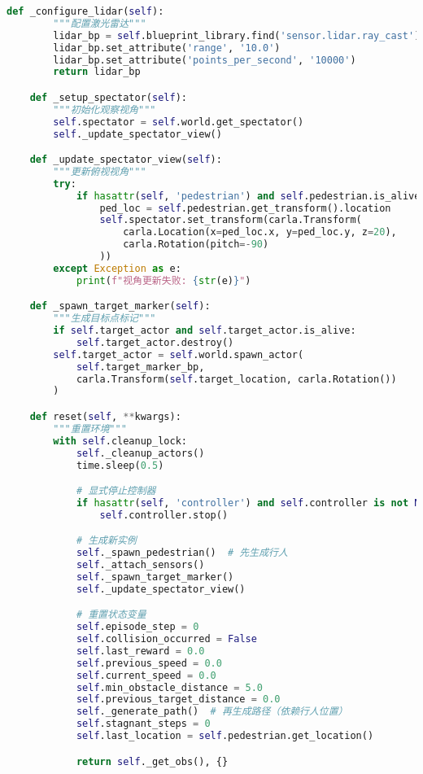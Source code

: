 \begin{lstlisting}[language=Python]
    def _configure_lidar(self):
        """配置激光雷达"""
        lidar_bp = self.blueprint_library.find('sensor.lidar.ray_cast')
        lidar_bp.set_attribute('range', '10.0')
        lidar_bp.set_attribute('points_per_second', '10000')
        return lidar_bp

    def _setup_spectator(self):
        """初始化观察视角"""
        self.spectator = self.world.get_spectator()
        self._update_spectator_view()

    def _update_spectator_view(self):
        """更新俯视视角"""
        try:
            if hasattr(self, 'pedestrian') and self.pedestrian.is_alive:
                ped_loc = self.pedestrian.get_transform().location
                self.spectator.set_transform(carla.Transform(
                    carla.Location(x=ped_loc.x, y=ped_loc.y, z=20),
                    carla.Rotation(pitch=-90)
                ))
        except Exception as e:
            print(f"视角更新失败: {str(e)}")

    def _spawn_target_marker(self):
        """生成目标点标记"""
        if self.target_actor and self.target_actor.is_alive:
            self.target_actor.destroy()
        self.target_actor = self.world.spawn_actor(
            self.target_marker_bp,
            carla.Transform(self.target_location, carla.Rotation())
        )

    def reset(self, **kwargs):
        """重置环境"""
        with self.cleanup_lock:
            self._cleanup_actors()
            time.sleep(0.5)

            # 显式停止控制器
            if hasattr(self, 'controller') and self.controller is not None and self.controller.is_alive:
                self.controller.stop()

            # 生成新实例
            self._spawn_pedestrian()  # 先生成行人
            self._attach_sensors()
            self._spawn_target_marker()
            self._update_spectator_view()

            # 重置状态变量
            self.episode_step = 0
            self.collision_occurred = False
            self.last_reward = 0.0
            self.previous_speed = 0.0
            self.current_speed = 0.0
            self.min_obstacle_distance = 5.0
            self.previous_target_distance = 0.0
            self._generate_path()  # 再生成路径（依赖行人位置）
            self.stagnant_steps = 0
            self.last_location = self.pedestrian.get_location()

            return self._get_obs(), {}


\end{lstlisting}
